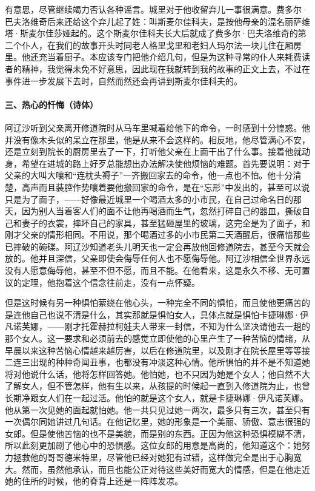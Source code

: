 有意思，尽管继续竭力否认各种谣言。城里对于他收留弃儿一事很满意。费多尔·巴夫洛维奇后来还给这个弃儿起了姓：叫斯麦尔佳科夫，是按他母亲的混名丽萨维塔·斯麦尔佳莎娅起的。这个斯麦尔佳科夫长大后就成了费多尔·巴夫洛维奇的第二个仆人，在我们的故事开头时同老人格里戈里和老妇人玛尔法一块儿住在厢房里。他还充当着厨子。本应该专门把他介绍几句，但是为这种寻常的仆人来耗费读者的精神，我觉得未免不好意思，因此现在我就转到我的故事的正文上去，不过在事件进一步发展下去时，自然而然还会再讲到斯麦尔佳科夫的。
\paragraph*{三、热心的忏悔（诗体）}
\par 阿辽沙听到父亲离开修道院时从马车里喊着给他下的命令，一时感到十分惶惑。他并没有像木头似的呆立在那里，他是从来不会这样的。相反地，他尽管满心不安，还是立刻到院长的厨房里去了一下，打听他父亲在上面干出了什么事。接着他就动身，希望在进城的路上好歹总能想出办法解决使他烦恼的难题。首先要说明：对于父亲的大叫大嚷和“连枕头褥子”一齐搬回家去的命令，他一点也不怕。他十分清楚，高声而且装腔作势嚷着要他搬回家的命令，是在“忘形”中发出的，甚至可以说只是为了面子，——好像最近城里一个喝酒太多的小市民，在自己过命名日的那天，因为别人当着客人们的面不让他再喝酒而生气，忽然打碎自己的器皿，撕破自己和妻子的衣裳，摔坏自己的家具，甚至猛砸屋里的玻璃，这完全是为了面子，和刚才父亲的情形相同。不用说，那个喝酒过多的小市民第二天酒醒后，很痛惜那些已摔破的碗碟。阿辽沙知道老头儿明天也一定会再放他回修道院去，甚至今天就会放的。他并且深信，父亲即使会侮辱任何人也不愿侮辱他。阿辽沙相信全世界永远没有人愿意侮辱他，甚至不但不愿，而且不能。在他看来，这是永久不移、无可置议的定理，他抱着这个信念往前走，没有一点怀疑。
\par 但是这时候有另一种惧怕萦绕在他心头，一种完全不同的惧怕，而且使他更痛苦的是连他自己也说不清是什么，其实那就是惧怕女人，具体点就是惧怕卡捷琳娜·伊凡诺芙娜，——刚才托霍赫拉柯娃夫人带来一封信，不知为什么坚决请他去一趟的那个女人。这一要求和必须前去的感觉立即使他的心里产生了一种苦恼的情绪，从早晨以来这种苦恼心情越来越厉害，以后在修道院里，以及刚才在院长屋里等等接二连三出现的种种奇闻丑事，也都没有冲淡这种心情。他所惧怕的并不是不知道她将对他说什么话，他将怎样回答她。他怕她，也不只因为她是个女人；他自然不大了解女人，但不管怎样，他有生以来，从孩提的时候起一直到入修道院为止，也曾长期净跟女人们在一起过活。他怕的就是这个女人，就是卡捷琳娜·伊凡诺芙娜。他从第一次见她的面起就怕她。他一共只见过她一两次，最多只有三次，甚至只有一次偶尔同她讲过几句话。在他记忆里，她的形象是一个美丽、骄傲、意志很强的女郎。但是使他苦恼的也不是美貌，而是别的东西。正因为他这种恐惧模糊不清，所以此刻更加剧了他心中的恐惧感。这位女郎的用意是高尚的，他知道这个：她努力拯救他的哥哥德米特里，尽管他已经对她犯有过错，这样做完全是出于心胸宽大。然而，虽然他承认，而且也能公正对待这些美好而宽大的情感，但是在他走近她的住所的时候，他的脊背上还是一阵阵发凉。
